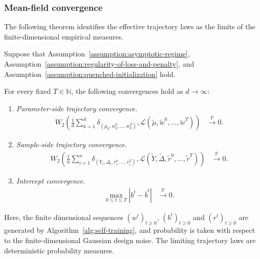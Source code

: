 \subsubsection{Mean-field convergence}

The following theorem identifies the effective trajectory laws
as the limits of the finite-dimensional empirical measures.

\begin{theorem}
\label{theorem:trajectory}
Suppose that Assumption~\ref{assumption:asymptotic-regime},
Assumption~\ref{assumption:regularity-of-loss-and-penalty},
and Assumption~\ref{assumption:quenched-initialization} hold.

For every fixed $T\in\mathbb N$, the following convergences hold
as $d\to\infty$:
\begin{enumerate}[label=(\roman*),wide]
    \item \emph{Parameter-side trajectory convergence.}
    \begin{align}
        W_2\left(
            \frac1d\sum_{k=1}^d
                \delta_{(\mu_k,w_k^0,\ldots,w_k^T)},
            \mathscr L(\tilde\mu,\tilde w^0,\ldots,\tilde w^T)
        \right)
        &\xrightarrow{\mathbb P}0.
        \label{eq:parameter-trajectory-limit}
    \end{align}

    \item \emph{Sample-side trajectory convergence.}
    \begin{align}
        W_2\left(
            \frac1n\sum_{i=1}^n
                \delta_{(Y_i,\Delta_i,r_i^0,\ldots,r_i^T)},
            \mathscr L(
                \tilde Y,\tilde\Delta,\tilde r^0,\ldots,\tilde r^T
            )
        \right)
        &\xrightarrow{\mathbb P}0.
        \label{eq:sample-trajectory-limit}
    \end{align}

    \item \emph{Intercept convergence.}
    \begin{align}
        \max_{0\leq t\leq T}|b^t-\bar b^t|
        &\xrightarrow{\mathbb P}0.
        \label{eq:mean-field-bias-convergence}
    \end{align}
\end{enumerate}
Here, the finite dimensional sequences $(w^t)_{t \ge 0}$, $(b^t)_{t \ge 0}$ and $(r^t)_{t \ge 0}$ are generated by Algorithm~\ref{alg:self-training}, and
probability is taken with respect to the finite-dimensional
Gaussian design noise. The limiting trajectory laws are
deterministic probability measures.
\end{theorem}
